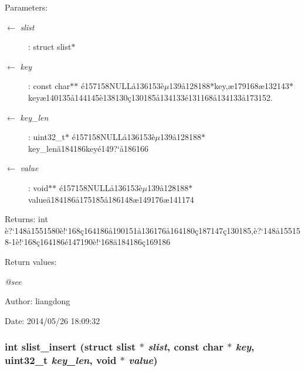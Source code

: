 \begin{Desc}
\item[Parameters:]
\begin{description}
\item[\mbox{$\leftarrow$} {\em slist}]: struct slist$\ast$ \item[\mbox{$\leftarrow$} {\em key}]: const char$\ast$$\ast$ \'{e}157158NULL\aa{}136153\`{e}$\mu$139\aa{}128188$\ast$key,\ae{}179168\ae{}132143$\ast$key\ae{}140135\aa{}144145\`{e}138130\c{c}130185\aa{}134133\'{e}131168\aa{}134133\aa{}173152. \item[\mbox{$\leftarrow$} {\em key\_\-len}]: uint32\_\-t$\ast$ \'{e}157158NULL\aa{}136153\`{e}$\mu$139\aa{}128188$\ast$key\_\-len\"{a}184186key\'{e}149?`\aa{}186166 \item[\mbox{$\leftarrow$} {\em value}]: void$\ast$$\ast$ \'{e}157158NULL\aa{}136153\`{e}$\mu$139\aa{}128188$\ast$value\"{a}184186\aa{}175185\aa{}186148\ae{}149176\ae{}141174 \end{description}
\end{Desc}
\begin{Desc}
\item[Returns:]int \`{e}?`148\aa{}1551580\`{e}!`168\c{c}164186\aa{}190151\aa{}136176\aa{}164180\c{c}187147\c{c}130185,\`{e}?`148\aa{}155158-1\`{e}!`168\c{c}164186\'{e}147190\`{e}!`168\"{a}184186\c{c}169186 \end{Desc}
\begin{Desc}
\item[Return values:]
\begin{description}
\item[{\em @see}]\end{description}
\end{Desc}
\begin{Desc}
\item[Author:]liangdong \end{Desc}
\begin{Desc}
\item[Date:]2014/05/26 18:09:32 \end{Desc}
\subsubsection{\setlength{\rightskip}{0pt plus 5cm}int slist\_\-insert (struct slist $\ast$ {\em slist}, const char $\ast$ {\em key}, uint32\_\-t {\em key\_\-len}, void $\ast$ {\em value})}\label{slist_8h_a2}


